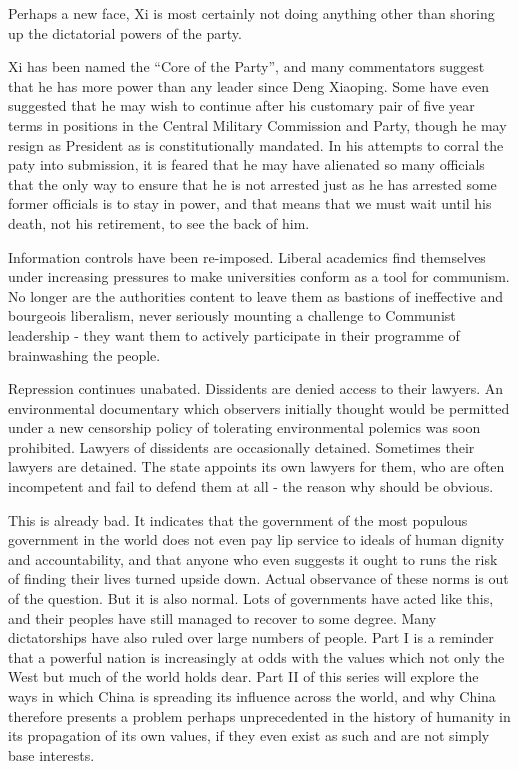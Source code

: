 \documentclass[10pt,a4paper,twocolumn]{article}
\newcounter{count}
\begin{document}
Perhaps a new face, Xi is most certainly not doing anything other than shoring up the dictatorial powers of the party.

Xi has been named the ``Core of the Party'', and many commentators suggest that he has more power than any leader since Deng Xiaoping. Some have even suggested that he may wish to continue after his customary pair of five year terms in positions in the Central Military Commission and Party, though he may resign as President as is constitutionally mandated. In his attempts to corral the paty into submission, it is feared that he may have alienated so many officials that the only way to ensure that he is not arrested just as he has arrested some former officials is to stay in power, and that means that we must wait until his death, not his retirement, to see the back of him.

Information controls have been re-imposed. Liberal academics find themselves under increasing pressures to make universities conform as a tool for communism. No longer are the authorities content to leave them as bastions of ineffective and bourgeois liberalism, never seriously mounting a challenge to Communist leadership - they want them to actively participate in their programme of brainwashing the people.

Repression continues unabated. Dissidents are denied access to their lawyers. An environmental documentary which observers initially thought would be permitted under a new censorship policy of tolerating environmental polemics was soon prohibited. Lawyers of dissidents are occasionally detained. Sometimes their lawyers are detained. The state appoints its own lawyers for them, who are often incompetent and fail to defend them at all - the reason why should be obvious.

This is already bad. It indicates that the government of the most populous government in the world does not even pay lip service to ideals of human dignity and accountability, and that anyone who even suggests it ought to runs the risk of finding their lives turned upside down. Actual observance of these norms is out of the question. But it is also normal. Lots of governments have acted like this, and their peoples have still managed to recover to some degree. Many dictatorships have also ruled over large numbers of people. Part I is a reminder that a powerful nation is increasingly at odds with the values which not only the West but much of the world holds dear. Part II of this series will explore the ways in which China is spreading its influence across the world, and why China therefore presents a problem perhaps unprecedented in the history of humanity in its propagation of its own values, if they even exist as such and are not simply base interests.



\end{document}
